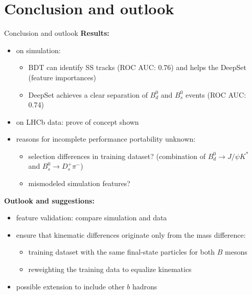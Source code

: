 \documentclass[aspectratio=1610, 10pt]{beamer}
\begin{document}
\section*{Conclusion and outlook}

\begin{frame}{Conclusion and outlook}
  \textbf{Results:}
  \begin{itemize}
    \item on simulation:
    \begin{itemize}
      \item BDT can identify SS tracks (ROC AUC: 0.76) and helps the DeepSet (feature importances)
      \item DeepSet achieves a clear separation of $B^0_d$ and $B^0_s$ events (ROC AUC: 0.74)
    \end{itemize}
    \item on LHCb data: prove of concept shown
    \item reasons for incomplete performance portability unknown:
    \begin{itemize}
      \item selection differences in training dataset? (combination of $B^0_d \rightarrow J/\psi K^*$ and $B^0_s \rightarrow D_s^+ \pi^-$)
      \item mismodeled simulation features?
    \end{itemize}
  \end{itemize}
  
  \pause
  \medskip
  \textbf{Outlook and suggestions:}
  \begin{itemize}
    \item feature validation: compare simulation and data
    \item ensure that kinematic differences originate only from the mass difference:
    \begin{itemize}
      \item training dataset with the same final-state particles for both $B$ mesons
      \item reweighting the training data to equalize kinematics
    \end{itemize}
    \item possible extension to include other $b$ hadrons
  \end{itemize}
\end{frame}

\appendix
\end{document}
